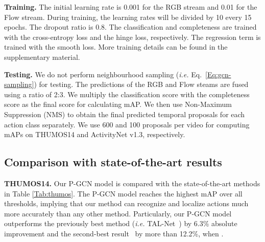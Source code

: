 \documentclass[10pt,twocolumn,letterpaper]{article}
\begin{document}
	
	\noindent \textbf{Training.} 
	The initial learning rate is 0.001 for the RGB stream and 0.01 for the Flow stream. 
	During training, the learning rates will be divided by 10 every 15 epochs. The dropout ratio is 0.8.
	The classification  and completeness  are trained with the cross-entropy loss and the hinge loss, respectively. The regression term  is trained with the smooth  loss. More training details can be found in the supplementary material. 
	
	
	
	


	




	\noindent \textbf{Testing.} 
	We do not perform neighbourhood sampling (\emph{i.e.} Eq.~\eqref{Eq:gcn-sampling}) for testing. The predictions of the RGB and Flow steams are fused using a ratio of 2:3.
	We multiply the classification score with the completeness score as the final score for calculating mAP.
	We then use Non-Maximum Suppression (NMS) to obtain the final predicted temporal proposals for each action class separately.
	We use 600 and 100 proposals per video for computing mAPs on THUMOS14 and ActivityNet v1.3, respectively. 
	
	
	
	
	\subsection{Comparison with state-of-the-art results}
	\noindent \textbf{THUMOS14.}
	Our P-GCN model is compared with the state-of-the-art methods in Table \ref{Tab:thumos}. The P-GCN model reaches the highest mAP over all thresholds, implying that our method can recognize and localize actions much more accurately than any other method. Particularly, our P-GCN model outperforms the previously best method (\emph{i.e.} TAL-Net~\cite{chao2018rethinking}) by 6.3\% absolute improvement and the second-best result~\cite{lin2018bsn} by more than 12.2\%, when .
\end{document}

